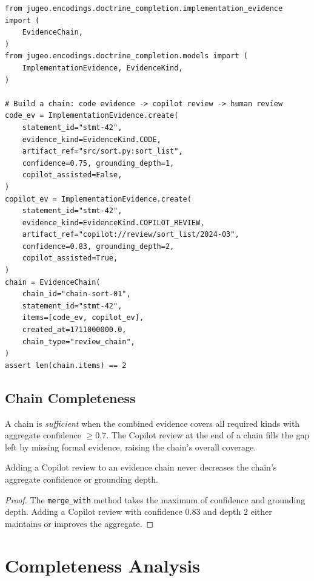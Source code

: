 \documentclass[11pt]{article}
\begin{document}
\begin{lstlisting}[style=jugeo-python]
from jugeo.encodings.doctrine_completion.implementation_evidence import (
    EvidenceChain,
)
from jugeo.encodings.doctrine_completion.models import (
    ImplementationEvidence, EvidenceKind,
)

# Build a chain: code evidence -> copilot review -> human review
code_ev = ImplementationEvidence.create(
    statement_id="stmt-42",
    evidence_kind=EvidenceKind.CODE,
    artifact_ref="src/sort.py:sort_list",
    confidence=0.75, grounding_depth=1,
    copilot_assisted=False,
)
copilot_ev = ImplementationEvidence.create(
    statement_id="stmt-42",
    evidence_kind=EvidenceKind.COPILOT_REVIEW,
    artifact_ref="copilot://review/sort_list/2024-03",
    confidence=0.83, grounding_depth=2,
    copilot_assisted=True,
)
chain = EvidenceChain(
    chain_id="chain-sort-01",
    statement_id="stmt-42",
    items=[code_ev, copilot_ev],
    created_at=1711000000.0,
    chain_type="review_chain",
)
assert len(chain.items) == 2
\end{lstlisting}

\subsection{Chain Completeness}

A chain is \emph{sufficient} when the combined evidence covers all required
kinds with aggregate confidence $\geq 0.7$.  The Copilot review at the end
of a chain fills the gap left by missing formal evidence, raising the chain's
overall coverage.

\begin{proposition}\label{prop:chain-mono}
Adding a Copilot review to an evidence chain never decreases the chain's
aggregate confidence or grounding depth.
\end{proposition}

\begin{proof}
The \texttt{merge\_with} method takes the maximum of confidence and grounding
depth.  Adding a Copilot review with confidence 0.83 and depth 2 either
maintains or improves the aggregate.
\end{proof}

\section{Completeness Analysis}\label{sec:completeness}
\end{document}
